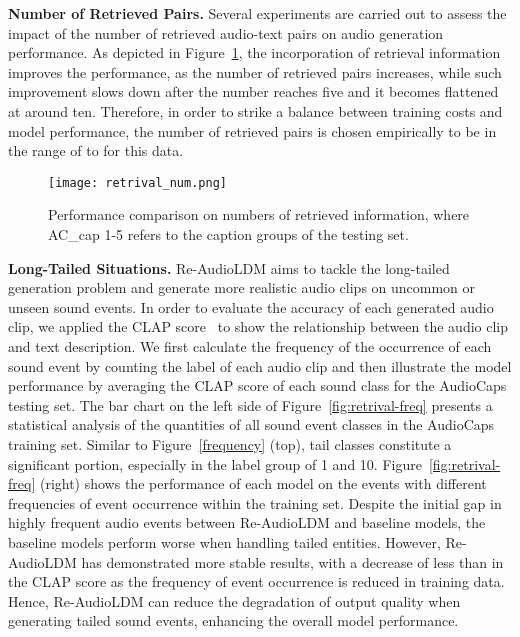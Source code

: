 \documentclass{article}
\begin{document}
\noindent
\textbf{Number of Retrieved Pairs.}
Several experiments are carried out to assess the impact of the number of retrieved audio-text pairs on audio generation performance. As depicted in Figure~\ref{fig:retriva-number}, the incorporation of retrieval information improves the performance, as the number of retrieved pairs increases, while such improvement slows down after the number reaches five and it becomes flattened at around ten. Therefore, in order to strike a balance between training costs and model performance, the number of retrieved pairs is chosen empirically to be in the range of  to  for this data.

\begin{figure}[htbp]
    \centering
    \texttt{[image: retrival\_num.png]}
    \caption{Performance comparison on numbers of retrieved information, where AC\_cap 1-5 refers to the caption groups of the testing set. }
    \label{fig:retriva-number}
\end{figure}

\noindent
\textbf{Long-Tailed Situations.}
Re-AudioLDM aims to tackle the long-tailed generation problem and generate more realistic audio clips on uncommon or unseen sound events. In order to evaluate the accuracy of each generated audio clip, we applied the CLAP score~\cite{clap} to show the relationship between the audio clip and text description. We first calculate the frequency of the occurrence of each sound event by counting the label of each audio clip and then illustrate the model performance by averaging the CLAP score of each sound class for the AudioCaps testing set. The bar chart on the left side of Figure~\ref{fig:retrival-freq} presents a statistical analysis of the quantities of all  sound event classes in the AudioCaps training set. Similar to Figure~\ref{frequency} (top), tail classes constitute a significant portion, especially in the label group of 1 and 10. Figure~\ref{fig:retrival-freq} (right) shows the performance of each model on the events with different frequencies of event occurrence within the training set. Despite the initial gap in highly frequent audio events between Re-AudioLDM and baseline models, the baseline models perform worse when handling tailed entities. However, Re-AudioLDM has demonstrated more stable results, with a decrease of less than  in the CLAP score as the frequency of event occurrence is reduced in training data. Hence, Re-AudioLDM can reduce the degradation of output quality when generating tailed sound events, enhancing the overall model performance. 
\end{document}
